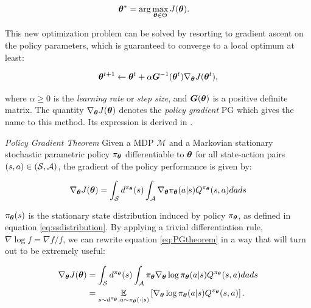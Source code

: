 \begin{align}
\boldsymbol{\theta}^* &= \arg \max_{\boldsymbol{\theta}\in\Theta}J(\boldsymbol{\theta}).
\end{align}

This new optimization problem can be solved by resorting to gradient ascent on the policy parameters, which is guaranteed to converge to a local optimum at least:

\begin{align}
\boldsymbol{\theta}^{t+1} \leftarrow \boldsymbol{\theta}^t+\alpha\boldsymbol{G}^{-1}(\boldsymbol{\theta}^t)\nabla_{\boldsymbol{\theta}}J(\boldsymbol{\theta}^t), \label{eq:paramsupdate}
\end{align}

where $\alpha\geq 0$ is the \emph{learning rate} or \emph{step size}, and $\boldsymbol{G}(\boldsymbol{\theta})$ is a positive definite matrix. The quantity $\nabla_{\boldsymbol{\theta}}J(\boldsymbol{\theta})$ denotes the \emph{policy gradient} \gls{PG} which gives the name to this method. Its expression is derived in \cite{sutton2000policy}.

\begin{theorem} \label{th:PGtheorem}
\emph{Policy Gradient Theorem} Given a \gls{MDP} $\mathcal{M}$ and a  Markovian stationary stochastic parametric policy $\pi_{\boldsymbol{\theta}}$ differentiable \wrt to $\boldsymbol{\theta}$ for all state-action pairs $(s,a)\in(\mathcal{S},\mathcal{A})$, the gradient of the policy performance is given by:

\begin{equation}
\nabla_{\boldsymbol{\theta}}J(\boldsymbol{\theta}) 
= \int_{\mathcal{S}}d^{\pi_{\boldsymbol{\theta}}}(s)\int_{\mathcal{A}}\nabla_{\boldsymbol{\theta}}\pi_{\boldsymbol{\theta}}(a|s)Q^{\pi_{\boldsymbol{\theta}}}(s,a)dads \nonumber \label{eq:PGtheorem}
\end{equation}
\end{theorem}

$\pi_{\boldsymbol{\theta}}(s)$ is the stationary state distribution induced by policy $\pi_{\boldsymbol{\theta}}$, as defined in equation \ref{eq:ssdistribution}. By applying a trivial differentiation rule, $\nabla\log f=\nabla f/f$, we can rewrite equation \ref{eq:PGtheorem} in a way that will turn out to be extremely useful:

\begin{align}
\nabla_{\boldsymbol{\theta}}J(\boldsymbol{\theta}) 
&= \int_{\mathcal{S}}d^{\pi_{\boldsymbol{\theta}}}(s)\int_{\mathcal{A}}\pi_{\boldsymbol{\theta}}\nabla_{\boldsymbol{\theta}}\log\pi_{\boldsymbol{\theta}}(a|s)Q^{\pi_{\boldsymbol{\theta}}}(s,a)dads \nonumber \\
&= \underset{s\sim d^{\pi_{\boldsymbol{\theta}}}, a\sim \pi_{\boldsymbol{\theta}}(\cdot|s)}{\mathbb{E}}\left[{\nabla_{\boldsymbol{\theta}}\log\pi_{\boldsymbol{\theta}}(a|s)Q^{\pi_{\boldsymbol{\theta}}}(s,a)}\right] . \label{eq:reinforcetrick} 
\end{align}

